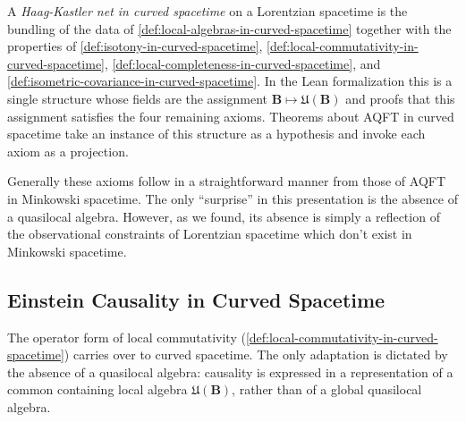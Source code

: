 \begin{definition}
    \label{def:haag-kastler-net-in-curved-spacetime}
    \leanok
    A \emph{Haag-Kastler net in curved spacetime} on a Lorentzian spacetime is the bundling of the data of \ref{def:local-algebras-in-curved-spacetime} together with the properties of \ref{def:isotony-in-curved-spacetime}, \ref{def:local-commutativity-in-curved-spacetime}, \ref{def:local-completeness-in-curved-spacetime}, and \ref{def:isometric-covariance-in-curved-spacetime}. In the Lean formalization this is a single structure whose fields are the assignment $\mathbf{B} \mapsto \mathfrak{U}(\mathbf{B})$ and proofs that this assignment satisfies the four remaining axioms. Theorems about AQFT in curved spacetime take an instance of this structure as a hypothesis and invoke each axiom as a projection.
\end{definition}

Generally these axioms follow in a straightforward manner from those of AQFT in Minkowski spacetime. The only ``surprise'' in this presentation is the absence of a quasilocal algebra. However, as we found, its absence is simply a reflection of the observational constraints of Lorentzian spacetime which don't exist in Minkowski spacetime.

\subsection{Einstein Causality in Curved Spacetime}

The operator form of local commutativity (\ref{def:local-commutativity-in-curved-spacetime}) carries over to curved spacetime. The only adaptation is dictated by the absence of a quasilocal algebra: causality is expressed in a representation of a common containing local algebra $\mathfrak{U}(\mathbf{B})$, rather than of a global quasilocal algebra.

